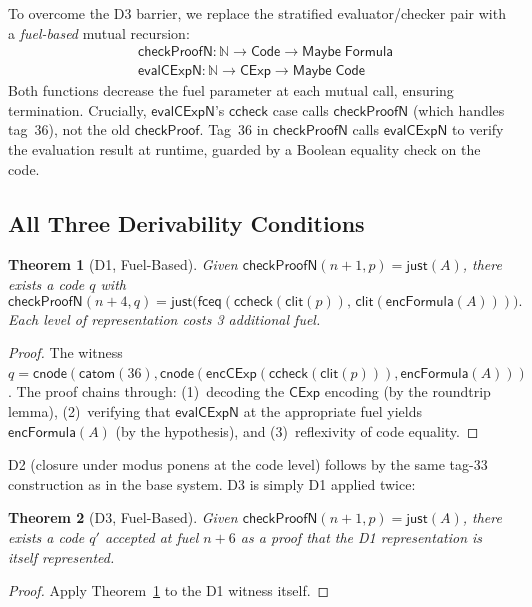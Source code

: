 \documentclass[11pt]{article}
\newtheorem{theorem}{Theorem}[section]
\newcommand{\Code}{\mathsf{Code}}
\newcommand{\CExp}{\mathsf{CExp}}
\newcommand{\Formula}{\mathsf{Formula}}
\newcommand{\Nat}{\mathbb{N}}
\newcommand{\evalCExpN}{\mathsf{evalCExpN}}
\newcommand{\checkProof}{\mathsf{checkProof}}
\newcommand{\checkProofN}{\mathsf{checkProofN}}
\newcommand{\encFormula}{\mathsf{encFormula}}
\newcommand{\clit}{\mathsf{clit}}
\newcommand{\ccheck}{\mathsf{ccheck}}
\newcommand{\catom}{\mathsf{catom}}
\newcommand{\cnode}{\mathsf{cnode}}
\newcommand{\fceq}{\mathsf{fceq}}
\begin{document}
To overcome the D3 barrier, we replace the stratified evaluator/checker
pair with a \emph{fuel-based} mutual recursion:
\begin{align*}
  &\checkProofN : \Nat \to \Code \to \mathsf{Maybe}\;\Formula \\
  &\evalCExpN : \Nat \to \CExp \to \mathsf{Maybe}\;\Code
\end{align*}
Both functions decrease the fuel parameter at each mutual call, ensuring
termination. Crucially, $\evalCExpN$'s $\ccheck$ case calls
$\checkProofN$ (which handles tag~36), not the old $\checkProof$.
Tag~36 in $\checkProofN$ calls $\evalCExpN$ to verify the evaluation
result at runtime, guarded by a Boolean equality check on the code.

\subsection{All Three Derivability Conditions}

\begin{theorem}[D1, Fuel-Based]
  \label{thm:d1fuel}
  Given $\checkProofN(n{+}1, p) = \mathsf{just}(A)$, there exists a
  code $q$ with
  \[
    \checkProofN(n{+}4, q) =
      \mathsf{just}\bigl(\fceq(\ccheck(\clit(p)),\, \clit(\encFormula(A)))\bigr).
  \]
  Each level of representation costs 3 additional fuel.
\end{theorem}

\begin{proof}
  The witness $q = \cnode(\catom(36), \cnode(\mathsf{encCExp}(\ccheck(\clit(p))), \encFormula(A)))$.
  The proof chains through: (1)~decoding the $\CExp$ encoding (by the
  roundtrip lemma), (2)~verifying that $\evalCExpN$ at the appropriate
  fuel yields $\encFormula(A)$ (by the hypothesis), and
  (3)~reflexivity of code equality.
\end{proof}

D2 (closure under modus ponens at the code level) follows by the same
tag-33 construction as in the base system. D3 is simply D1 applied twice:

\begin{theorem}[D3, Fuel-Based]
  \label{thm:d3fuel}
  Given $\checkProofN(n{+}1, p) = \mathsf{just}(A)$, there exists a
  code $q'$ accepted at fuel $n{+}6$ as a proof that the D1
  representation is itself represented.
\end{theorem}

\begin{proof}
  Apply Theorem~\ref{thm:d1fuel} to the D1 witness itself.
\end{proof}
\end{document}
